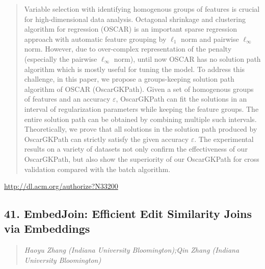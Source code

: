 \documentclass{article}
\begin{document}
\begin{quote}
Variable selection with identifying homogenous groups of features is crucial for high-dimensional data analysis. Octagonal shrinkage and clustering algorithm for regression (OSCAR) is an important sparse regression approach with automatic feature grouping by $\ell_{1}$ norm and pairwise $\ell_{\infty}$ norm. However, due to over-complex representation of the penalty (especially the pairwise $\ell_{\infty}$ norm), until now OSCAR has no solution path algorithm which is mostly useful for tuning the model. To address this challenge, in this paper, we propose a groups-keeping solution path algorithm of OSCAR (OscarGKPath). Given a set of homogenous groups of features and an accuracy $\varepsilon$, OscarGKPath can fit the solutions in an interval of regularization parameters while keeping the feature groups. The entire solution path can be obtained by combining multiple such intervals. Theoretically, we prove that all solutions in the solution path produced by OscarGKPath can strictly satisfy the given accuracy $\varepsilon$. The experimental results on a variety of datasets not only confirm the effectiveness of our OscarGKPath, but also show the superiority of our OscarGKPath for cross validation compared with the batch algorithm.
\end{quote}

\href{http://dl.acm.org/authorize?N33200}{http://dl.acm.org/authorize?N33200}

\subsection{41. EmbedJoin: Efficient Edit Similarity Joins via Embeddings}

\begin{quote}
\footnotesize{\textit{Haoyu Zhang (Indiana University Bloomington);Qin Zhang (Indiana University Bloomington)}}

\end{quote}
\end{document}
